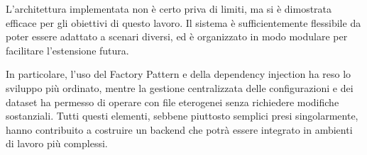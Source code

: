 L'architettura implementata non è certo priva di limiti, ma si è dimostrata efficace per gli obiettivi di questo lavoro. Il sistema è sufficientemente flessibile da poter essere adattato a scenari diversi, ed è organizzato in modo modulare per facilitare l'estensione futura.


In particolare, l'uso del Factory Pattern e della dependency injection ha reso lo sviluppo più ordinato, mentre la gestione centralizzata delle configurazioni e dei dataset ha permesso di operare con file eterogenei senza richiedere modifiche sostanziali. Tutti questi elementi, sebbene piuttosto semplici presi singolarmente, hanno contribuito a costruire un backend che potrà essere integrato in ambienti di lavoro più complessi.
